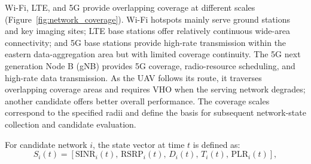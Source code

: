 \documentclass[preprint,12pt]{elsarticle}
\begin{document}
Wi-Fi, LTE, and 5G provide overlapping coverage at different scales (Figure~\ref{fig:network_coverage}). Wi-Fi hotspots mainly serve ground stations and key imaging sites; LTE base stations offer relatively continuous wide-area connectivity; and 5G base stations provide high-rate transmission within the eastern data-aggregation area but with limited coverage continuity. The 5G next generation Node B (gNB) provides 5G coverage, radio-resource scheduling, and high-rate data transmission. As the UAV follows its route, it traverses overlapping coverage areas and requires VHO when the serving network degrades; another candidate offers better overall performance. The coverage scales correspond to the specified radii and define the basis for subsequent network-state collection and candidate evaluation.

For candidate network $i$, the state vector at time $t$ is defined as:
\begin{equation}
S_i(t)=\left[\mathrm{SINR}_i(t),\,\mathrm{RSRP}_i(t),\,D_i(t),\,T_i(t),\,\mathrm{PLR}_i(t)\right],
\label{eq:state}
\end{equation}
\end{document}
